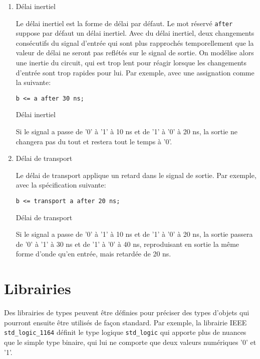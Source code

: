 \documentclass[letter, oneside]{book}
\begin{document}
\begin{enumerate}
\item Délai inertiel
\label{sec:org0c507a3}

Le délai inertiel est la forme de délai par défaut. Le mot réservé
\texttt{after} suppose par défaut un délai inertiel. Avec du délai inertiel,
deux changements consécutifs du signal d'entrée qui sont plus
rapprochés temporellement que la valeur de délai ne seront pas
reflétés sur le signal de sortie. On modélise alors une inertie du
circuit, qui est trop lent pour réagir lorsque les changements
d'entrée sont trop rapides pour lui. Par exemple, avec une
assignation comme la suivante:

\begin{listing}[htbp]
\begin{verbatim}
b <= a after 30 ns;
\end{verbatim}
\caption{Délai inertiel}
\end{listing}

Si le signal a passe de '0' à '1' à 10 ns et de '1' à '0' à 20 ns, la
sortie ne changera pas du tout et restera tout le temps à '0'.

\item Délai de transport
\label{sec:org65e5fc4}

Le délai de transport applique un retard dans le signal de sortie. Par
exemple, avec la spécification suivante:

\begin{listing}[htbp]
\begin{verbatim}
b <= transport a after 20 ns;
\end{verbatim}
\caption{Délai de transport}
\end{listing}
Si le signal a passe de '0' à '1' à 10 ns et de '1' à '0' à 20 ns, la
sortie passera de '0' à '1' à 30 ns et de '1' à '0' à 40 ns,
reproduisant en sortie la même forme d'onde qu'en entrée, mais
retardée de 20 ns.
\end{enumerate}

\section{Librairies}
\label{sec:org347b4c3}

Des librairies de types peuvent être définies pour préciser des types
d'objets qui pourront ensuite être utilisés de façon standard. Par
exemple, la librairie IEEE \texttt{std\_logic\_1164} définit le type logique
\texttt{std\_logic} qui apporte plus de nuances que le simple type binaire,
qui lui ne comporte que deux valeurs numériques '0' et '1'.
\end{document}
